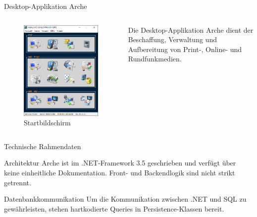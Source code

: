 \documentclass[toc]{beamer}
\begin{document}
        \begin{frame}{Desktop-Applikation \glqq Arche\grqq{}}
            \begin{columns}
                \begin{figure}[htp]
                                \centering
                                \includegraphics[scale=0.4]{arche.png}
                                \caption{Startbildschirm}
                                \label{fig:my_label}
                            \end{figure}
                Die Desktop-Applikation \glqq Arche\grqq{} dient der Beschaffung, Verwaltung und Aufbereitung von Print-, Online- und Rundfunkmedien.
            \end{columns}
        \end{frame}
        
        \begin{frame}{Technische Rahmendaten}
            \begin{block}{Architektur}
                \glqq Arche\grqq{} ist im .NET-Framework 3.5 geschrieben und verfügt über keine einheitliche Dokumentation. Front- und Backendlogik sind nicht strikt getrennt.
            \end{block}
            \begin{block}{Datenbankkommunikation}
                Um die Kommunikation zwischen .NET und SQL zu gewährleisten, stehen hartkodierte Queries in Persistence-Klassen bereit.
            \end{block}
        \end{frame}
                
\end{document}
